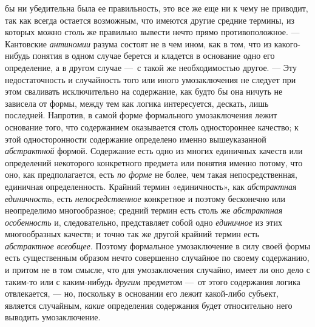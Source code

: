 \documentclass[twoside]{article}
\begin{document}
{{{бы ни убедительна была ее правильность, это все же еще ни к чему не
приводит, так как всегда остается возможным, что имеются другие средние
термины, из которых можно столь же правильно вывести нечто прямо
противоположное. — Кантовские
{\em антиномии} разума
состоят не в чем ином, как в том, что из какого-нибудь понятия в одном
случае берется и кладется в основание одно его определение, а в другом
случае  —~с такой же необходимостью другое. —
Эту недостаточность и случайность того или иного
умозаключения не следует при этом сваливать исключительно на содержание,
как будто бы она ничуть не зависела от формы, между тем как логика
интересуется, дескать, лишь последней. Напротив, в самой форме формального
умозаключения лежит основание того, что содержанием оказывается столь
одностороннее качество; к этой односторонности содержание определено именно
вышеуказанной {\em абстрактной}
формой. Содержание есть одно из многих единичных качеств или
определений некоторого конкретного предмета или понятия именно потому, что
оно, как предполагается, есть {\em по
форме} не более, чем такая непосредственная, единичная
определенность. Крайний термин «единичность», как
{\em абстрактная единичность},
есть
{\em непосредственное}
конкретное и поэтому бесконечно или неопределимо
многообразное; средний термин есть столь же
{\em абстрактная
}{\em особенность} и,
следовательно, представляет собой одно
{\em единичное} из этих
многообразных качеств; и точно так же другой крайний термин есть
{\em абстрактное всеобщее}.
Поэтому формальное умозаключение в силу своей формы есть
существенным образом нечто совершенно случайное по своему содержанию, и
притом не в том смысле, что для умозаключения случайно, имеет ли оно дело с
таким-то или с каким-нибудь
{\em другим} предметом
—~от этого содержания логика отвлекается, —
но, поскольку в основании его лежит какой-либо субъект,
является случайным, {\em какие}
определения содержания будет относительно него выводить
умозаключение.

}}}
\end{document}
